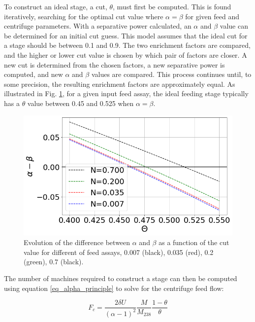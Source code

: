 To construct an ideal stage, a cut, $\theta$, must first be computed.
This is found iteratively, searching for the optimal cut value where $\alpha = \beta$
for given feed and centrifuge parameters. With a separative power calculated,
an $\alpha$ and $\beta$ value can be determined for an initial cut guess. This
model assumes that the ideal cut for a stage should be between 0.1 and 0.9. The
two enrichment factors are compared, and the higher or lower cut value is chosen
by which pair of factors are closer. A new cut is determined from the chosen
factors, a new separative power is computed, and new $\alpha$ and $\beta$ values
are compared. This process continues until, to some precision, the resulting
enrichment factors are approximately equal. As illustrated in Fig. \ref{fig_a_m_b},
for a given input feed assay, the ideal feeding stage typically has a $\theta$
value between 0.45 and 0.525 when $\alpha = \beta$.

\begin{figure}[h!] %
    \centering
    \includegraphics[scale=0.5]{alpha_minus_beta}
    \caption{Evolution of the difference between $\alpha$ and $\beta$ as a
    function of the cut value for different of feed assays, 0.007 (black),
    0.035 (red), 0.2 (green), 0.7 (black). }
    \label{fig_a_m_b}
\end{figure}

The number of machines required to construct a stage can then be computed using
equation \eqref{eq_alpha_principle} to solve for the centrifuge feed flow:

\begin{equation}\label{eq_cent_feed}
    F_c = \frac{2 \delta U}{(\alpha - 1)^2} \frac{M}{M_{238}} \frac{1-\theta}{\theta}
\end{equation}

